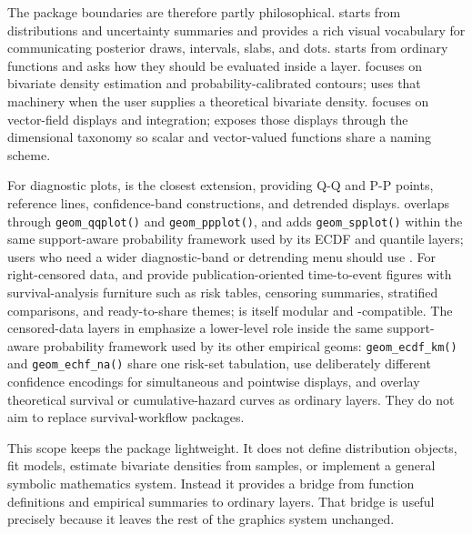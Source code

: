 The package boundaries are therefore partly philosophical. 
starts from distributions and uncertainty summaries and provides a rich visual
vocabulary for communicating posterior draws, intervals, slabs, and dots.
 starts from ordinary  functions and asks how they
should be evaluated inside a  layer. 
focuses on bivariate density estimation and probability-calibrated contours;
 uses that machinery when the user supplies a theoretical
bivariate density.  focuses on vector-field displays and
integration;  exposes those displays through the dimensional
taxonomy so scalar and vector-valued functions share a naming scheme.

For diagnostic plots,  \citep{almeida2018qqplotr, qqplotr} is the
closest  extension, providing Q-Q and P-P points, reference
lines, confidence-band constructions, and detrended displays. 
overlaps through \texttt{geom\_qqplot()} and \texttt{geom\_ppplot()}, and adds \texttt{geom\_spplot()}
within the same support-aware probability framework used by its ECDF and
quantile layers; users who need a wider diagnostic-band or detrending menu
should use . For right-censored data, 
\citep{survminer} and  \citep{ggsurvfit} provide publication-oriented
time-to-event figures with survival-analysis furniture such as risk tables,
censoring summaries, stratified comparisons, and ready-to-share themes;
 is itself modular and -compatible. The
censored-data layers in  emphasize a lower-level role inside
the same support-aware probability framework used by its other empirical geoms:
\texttt{geom\_ecdf\_km()} and \texttt{geom\_echf\_na()} share one risk-set tabulation, use
deliberately different confidence encodings for simultaneous and pointwise
displays, and overlay theoretical survival or cumulative-hazard curves as
ordinary layers. They do not aim to replace survival-workflow packages.

This scope keeps the package lightweight. It does not define distribution
objects, fit models, estimate bivariate densities from samples, or implement a
general symbolic mathematics system. Instead it provides a bridge from function
definitions and empirical summaries to ordinary  layers. That
bridge is useful precisely because it leaves the rest of the graphics system
unchanged.

